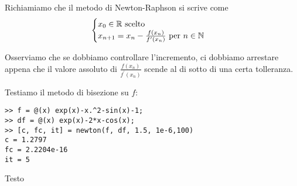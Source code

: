 Richiamiamo che il metodo di \textenglish{Newton-Raphson} si scrive come
\[\begin{cases} x_0 \in \mathbb R \text{ scelto} \\ x_{n+1} = x_n - \frac{f(x_n)}{f^\prime (x_n)} \text{ per } n \in \mathbb N \end{cases}\]

Osserviamo che se dobbiamo controllare l'incremento, ci dobbiamo arrestare appena che il valore assoluto di \(\frac{f(x_n)}{f^\prime (x_n)}\) scende al di sotto di una certa tolleranza. 



Testiamo il metodo di bisezione su \(f\):

\begin{lstlisting}[numbers=none]
>> f = @(x) exp(x)-x.^2-sin(x)-1;
>> df = @(x) exp(x)-2*x-cos(x);
>> [c, fc, it] = newton(f, df, 1.5, 1e-6,100)
c = 1.2797
fc = 2.2204e-16
it = 5
\end{lstlisting}


\begin{esercizio}
Testo
\end{esercizio}


